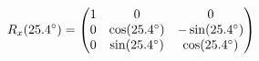\documentclass[preview]{standalone}
\begin{document}
\begin{align*}
\special{dvisvgm:raw <g id='unique000'>}R_x(25.4^\circ) = \begin{pmatrix} 1 & 0 & 0 \\ 0 & \cos(25.4^\circ) & -\sin(25.4^\circ) \\ 0 & \sin(25.4^\circ) & \cos(25.4^\circ) \end{pmatrix}\special{dvisvgm:raw </g>}
\end{align*}
\end{document}
